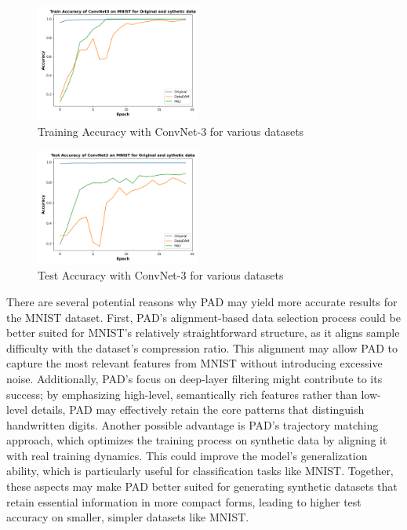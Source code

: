 \documentclass[conference, compsoc]{IEEEtran}
\begin{document}
	\begin{figure}[H]
		\centering
		\includegraphics[width=0.48\textwidth]{train_acc_task2.png}
		\caption{Training Accuracy with ConvNet-3 for various datasets}
		\label{fig:train_acc_task2}
	\end{figure}
	
	\begin{figure}[H]
		\centering
		\includegraphics[width=0.48\textwidth]{test_acc_task2.png}
		\caption{Test Accuracy with ConvNet-3 for various datasets}
		\label{fig:test_acc_task2}
	\end{figure}
	
	There are several potential reasons why PAD may yield more accurate results for the MNIST dataset. First, PAD’s alignment-based data selection process could be better suited for MNIST’s relatively straightforward structure, as it aligns sample difficulty with the dataset’s compression ratio. This alignment may allow PAD to capture the most relevant features from MNIST without introducing excessive noise. Additionally, PAD’s focus on deep-layer filtering might contribute to its success; by emphasizing high-level, semantically rich features rather than low-level details, PAD may effectively retain the core patterns that distinguish handwritten digits. Another possible advantage is PAD’s trajectory matching approach, which optimizes the training process on synthetic data by aligning it with real training dynamics. This could improve the model’s generalization ability, which is particularly useful for classification tasks like MNIST. Together, these aspects may make PAD better suited for generating synthetic datasets that retain essential information in more compact forms, leading to higher test accuracy on smaller, simpler datasets like MNIST.
	
\end{document}
